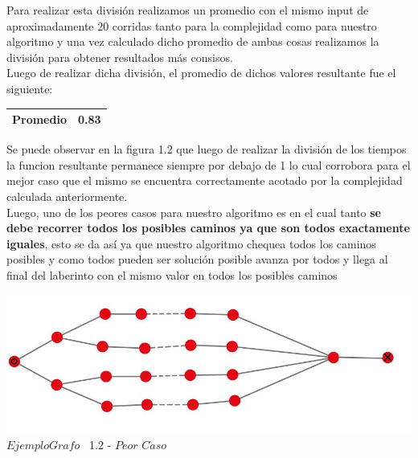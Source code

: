  Para realizar esta divisi\'on realizamos un promedio con el mismo input de aproximadamente 20 corridas tanto para la complejidad como para nuestro algoritmo y una vez calculado dicho promedio de ambas cosas realizamos la divisi\'on para
obtener resultados m\'as consisos.\\ 

Luego de realizar dicha divisi\'on, el promedio de dichos valores resultante fue el siguiente:

\begin{center}
\begin{table}[H]

    \begin{tabular}{ | l |l |}
    \hline

\textbf{Promedio} & 0.83 \\ \hline

    \end{tabular}
\end{table}
\end{center}


Se puede observar en la figura 1.2 que luego de realizar la divisi\'on de los tiempos la funcion resultante permanece siempre por debajo de 1 lo cual corrobora para el mejor caso que el mismo se encuentra correctamente acotado por la complejidad calculada anteriormente.\\

Luego, uno de los peores casos para nuestro algoritmo es en el cual tanto \textbf{se debe recorrer todos los posibles caminos ya que son todos exactamente iguales}, esto se da as\'i ya que nuestro algoritmo chequea todos los caminos posibles y como todos pueden ser soluci\'on posible avanza por todos y llega al final del laberinto con el mismo valor en todos los posibles caminos\\

\vspace*{0.3cm} \vspace*{0.3cm}
  \begin{center}
\includegraphics[scale=0.65]{./EJ1/ej1grafopeorcaso.jpeg}
{$Ejemplo Grafo$ \ 1.2 - $Peor$ $Caso$}
  \end{center}
  \vspace*{0.3cm}


